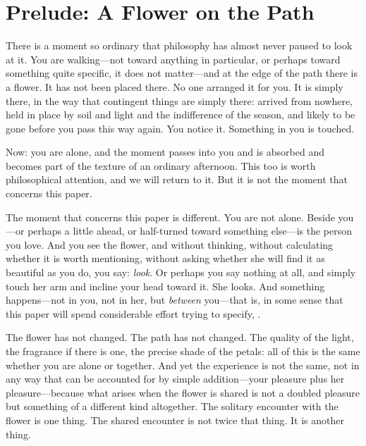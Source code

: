 \section{Prelude: A Flower on the Path}
\label{p14:sec:prelude}

\noindent
There is a moment so ordinary that philosophy has almost never paused to look at it. You are walking---not toward anything in particular, or perhaps toward something quite specific, it does not matter---and at the edge of the path there is a flower. It has not been placed there. No one arranged it for you. It is simply there, in the way that contingent things are simply there: arrived from nowhere, held in place by soil and light and the indifference of the season, and likely to be gone before you pass this way again. You notice it. Something in you is touched.

Now: you are alone, and the moment passes into you and is absorbed and becomes part of the texture of an ordinary afternoon. This too is worth philosophical attention, and we will return to it. But it is not the moment that concerns this paper.

The moment that concerns this paper is different. You are not alone. Beside you---or perhaps a little ahead, or half-turned toward something else---is the person you love. And you see the flower, and without thinking, without calculating whether it is worth mentioning, without asking whether she will find it as beautiful as you do, you say: \emph{look}. Or perhaps you say nothing at all, and simply touch her arm and incline your head toward it. She looks. And something happens---not in you, not in her, but \emph{between} you---that is, in some sense that this paper will spend considerable effort trying to specify, .

 The flower has not changed. The path has not changed. The quality of the light, the fragrance if there is one, the precise shade of the petals: all of this is the same whether you are alone or together. And yet the experience is not the same, not in any way that can be accounted for by simple addition---your pleasure plus her pleasure---because what arises when the flower is shared is not a doubled pleasure but something of a different kind altogether. The solitary encounter with the flower is one thing. The shared encounter is not twice that thing. It is another thing.

